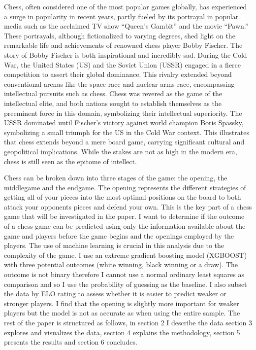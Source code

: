 \documentclass[12pt,preprint, authoryear]{elsarticle}
\numberwithin{equation}{section}
\numberwithin{figure}{section}
\numberwithin{table}{section}
\begin{document}
Chess, often considered one of the most popular games globally, has
experienced a surge in popularity in recent years, partly fueled by its
portrayal in popular media such as the acclaimed TV show ``Queen's
Gambit'' and the movie ``Pawn.'' These portrayals, although
fictionalized to varying degrees, shed light on the remarkable life and
achievements of renowned chess player Bobby Fischer. The story of Bobby
Fischer is both inspirational and incredibly sad. During the Cold War,
the United States (US) and the Soviet Union (USSR) engaged in a fierce
competition to assert their global dominance. This rivalry extended
beyond conventional arenas like the space race and nuclear arms race,
encompassing intellectual pursuits such as chess. Chess was revered as
the game of the intellectual elite, and both nations sought to establish
themselves as the preeminent force in this domain, symbolizing their
intellectual superiority. The USSR dominated until Fischer's victory
against world champion Boris Spassky, symbolizing a small triumph for
the US in the Cold War context. This illustrates that chess extends
beyond a mere board game, carrying significant cultural and geopolitical
implications. While the stakes are not as high in the modern era, chess
is still seen as the epitome of intellect.

Chess can be broken down into three stages of the game: the opening, the
middlegame and the endgame. The opening represents the different
strategies of getting all of your pieces into the most optimal positions
on the board to both attack your opponents pieces and defend your own.
This is the key part of a chess game that will be investigated in the
paper. I want to determine if the outcome of a chess game can be
predicted using only the information available about the game and
players before the game begins and the openings employed by the players.
The use of machine learning is crucial in this analysis due to the
complexity of the game. I use an extreme gradient boosting model
(XGBOOST) with three potential outcomes (white winning, black winning or
a draw). The outcome is not binary therefore I cannot use a normal
ordinary least squares as comparison and so I use the probability of
guessing as the baseline. I also subset the data by ELO rating to assess
whether it is easier to predict weaker or stronger players. I find that
the opening is slightly more important for weaker players but the model
is not as accurate as when using the entire sample. The rest of the
paper is structured as follows, in section 2 I describe the data section
3 explores and visualizes the data, section 4 explains the methodology,
section 5 presents the results and section 6 concludes.
\end{document}
